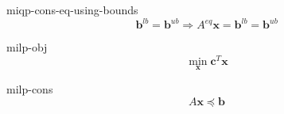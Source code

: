 \EQUATION miqp-cons-eq-using-bounds
\begin{equation}
  \label{eq:miqp-cons-eq-using-bounds}
  \mathbf{b}^{lb} = \mathbf{b}^{ub} \Rightarrow A^{eq}\mathbf{x} = \mathbf{b}^{lb} = \mathbf{b}^{ub}
\end{equation}
\ENDEQUATION

\bigskip %

\EQUATION milp-obj
\begin{equation}
  \label{eq:milp-obj}
  \min_{\mathbf{x}} \mathbf{c}^{T}\mathbf{x}
\end{equation}
\ENDEQUATION

\bigskip %

\EQUATION milp-cons
\begin{equation}
  \label{eq:milp-cons}
  A\mathbf{x} \preceq \mathbf{b}
\end{equation}
\ENDEQUATION

\bigskip %